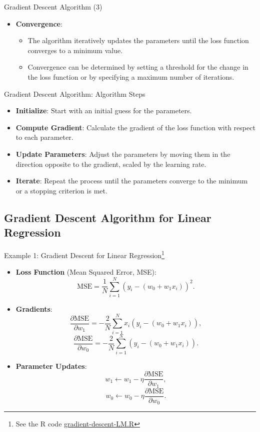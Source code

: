 \documentclass[10pt, hyperref={colorlinks = true,linkcolor = blue}]{beamer}
\begin{document}
{{\begin{frame}{Gradient Descent Algorithm (3)}
\begin{itemize}
    \item \textbf{Convergence}:
    \begin{itemize}
        \item The algorithm iteratively updates the parameters until the loss function converges to a minimum value.
        \item Convergence can be determined by setting a threshold for the change in the loss function or by specifying a maximum number of iterations.
    \end{itemize}
     \end{itemize}
\end{frame}

\begin{frame}{Gradient Descent Algorithm: Algorithm Steps}
\begin{itemize}
        \item \textbf{Initialize}: Start with an initial guess for the parameters.
        \item \textbf{Compute Gradient}: Calculate the gradient of the loss function with respect to each parameter.
        \item \textbf{Update Parameters}: Adjust the parameters by moving them in the direction opposite to the gradient, scaled by the learning rate.
        \item \textbf{Iterate}: Repeat the process until the parameters converge to the minimum or a stopping criterion is met.
    \end{itemize}
\end{frame}

}
{\subsection{Gradient Descent Algorithm for Linear Regression}
\begin{frame}{Example 1: Gradient Descent for Linear Regression\footnote{See the R code \href{https://github.com/yadavrishikesh/Into-NNs/tree/main/code}{gradient-descent-LM.R}}}
\begin{itemize}
        \item \textbf{Loss Function} (Mean Squared Error, MSE):
        \[
        \text{MSE} = \frac{1}{N} \sum_{i=1}^{N} (y_i - (w_0 + w_1 x_i))^2.
        \]
        \item \textbf{Gradients}:
        \[
        \frac{\partial \text{MSE}}{\partial w_1} = -\frac{2}{N} \sum_{i=1}^{N} x_i (y_i - (w_0   + w_1 x_i)),
        \]
        \[
        \frac{\partial \text{MSE}}{\partial w_0} = -\frac{2}{N} \sum_{i=1}^{N} (y_i - (w_0+ w_1 x_i)).
        \]
        \item \textbf{Parameter Updates}:
        \[
        w_1 \leftarrow w_1 - \eta \frac{\partial \text{MSE}}{\partial w_1},
        \]
        \[
        w_0 \leftarrow w_0 - \eta \frac{\partial \text{MSE}}{\partial w_0}.
        \]
   

\end{itemize}
\end{frame}}}
\end{document}

